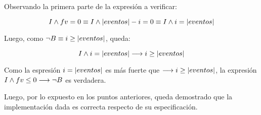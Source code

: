 \documentclass[10pt,a4paper]{article}
\begin{document}
 Observando la primera parte de la expresión a verificar:
	
\begin{equation}
	I \land fv=0 \equiv I \land |eventos| - i = 0 \equiv I \land i = |eventos|
\end{equation}
   
 Luego, como $\neg B \equiv i \geq |eventos|$, queda:
   
\begin{equation}
	I \land i = |eventos| \longrightarrow i \geq |eventos|
\end{equation}
   
 Como la espresión $i = |eventos|$ es más fuerte que $\longrightarrow i \geq |eventos|$,
 la expresión $I \land fv \leq 0 \longrightarrow \neg B$ es verdadera.
   
\vspace{0.3cm}
  
 Luego, por lo expuesto en los puntos anteriores, queda demostrado que la implementación dada es correcta respecto de su especificación.
  
\end{document}
